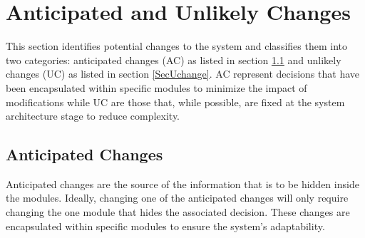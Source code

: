 \documentclass[12pt, titlepage]{article}
\begin{document}
\section{Anticipated and Unlikely Changes} \label{SecChange}

This section identifies potential changes to the system and classifies them into
two categories: anticipated changes (AC) as listed in section \ref{SecAchange} and
unlikely changes (UC) as listed in section \ref{SecUchange}. AC represent decisions 
that have been encapsulated within specific modules to minimize the impact of 
modifications while UC are those that, while possible, are fixed at the system 
architecture stage to reduce complexity.

\subsection{Anticipated Changes} \label{SecAchange}

Anticipated changes are the source of the information that is to be hidden
inside the modules. Ideally, changing one of the anticipated changes will only
require changing the one module that hides the associated decision. These changes
are encapsulated within specific modules to ensure the system's adaptability.
\end{document}
